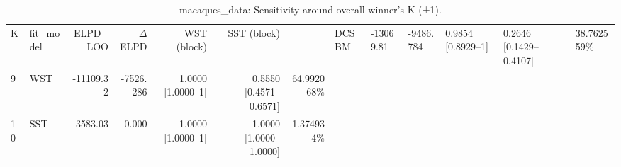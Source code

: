 \begin{table}[!h]
\centering
\caption{macaques_data: Sensitivity around overall winner's K (±1).\\\label{tab:app-macaques_data-C-sensitivity}}
\centering
\begin{tabular}[t]{llrrrrr}
\toprule
K & fit_model & ELPD\_LOO & $\Delta$ELPD & WST (block) & SST (block) & %
 & DCSBM & -13069.81 & -9486.784 & 0.9854 [0.8929--1] & 0.2646 [0.1429--0.4107] & 38.762559\%\\
9 & WST & -11109.32 & -7526.286 & 1.0000 [1.0000--1] & 0.5550 [0.4571--0.6571] & 64.992068\%\\
10 & SST & -3583.03 & 0.000 & 1.0000 [1.0000--1] & 1.0000 [1.0000--1.0000] & 1.374934\%\\
\bottomrule
\end{tabular}
\end{table}
